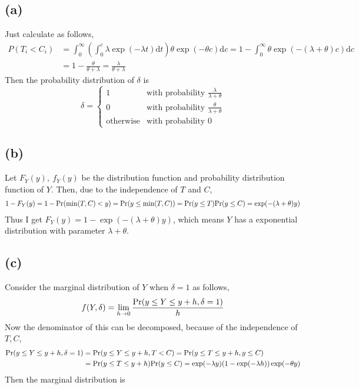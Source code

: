 \documentclass{article}
\begin{document}
\subsection{(a)}
Just calculate as follows,
\begin{align*}
	P(T_i < C_i) &= \int_0^{\infty} \left( \int_0^c \lambda \exp\left( -\lambda t \right) \mathrm{d}t\right) \theta \exp \left( -\theta c \right) \mathrm{d}c = 1 - \int_0^{\infty} \theta \exp \left( -(\lambda+\theta)c \right) \mathrm{d}c \\
	&= 1 - \frac{\theta}{\theta + \lambda} = \frac{\lambda}{ \theta + \lambda}
\end{align*}
Then the probability distribution of $\delta$ is
\begin{equation}
	\delta = 
	\begin{cases}
		1 & \text{with probability $\frac{\lambda}{\lambda + \theta}$} \\
		0 & \text{with probability $\frac{\theta}{\lambda + \theta}$} \\
		\text{otherwise} & \text{with probability $0$}
	\end{cases} \nonumber
\end{equation}

\subsection{(b)}
Let $F_Y(y),\ f_Y(y)$ be the distribution function and probability distribution function of $Y$. Then, due to the independence of $T$ and $C$,
\begin{align*}
	1 - F_Y(y) = 1- {\rm Pr} (\min(T, C) < y) = {\rm Pr}(y \leq \min(T,C)) = {\rm Pr}(y \leq T) {\rm Pr}(y \leq C) = \exp(-(\lambda + \theta)y)
\end{align*}
Thus I get $F_Y(y) = 1 - \exp(-(\lambda + \theta)y)$, which means $Y$ has a exponential distribution with parameter $\lambda + \theta$.

\subsection{(c)}
Consider the marginal distribution of $Y$ when $\delta = 1$ as follows,
\begin{align*}
	f(Y, \delta) = \lim_{h \to 0} \frac{{\rm Pr}(y \leq Y \leq y + h, \delta = 1)}{h}
\end{align*}
Now the denominator of this can be decomposed, because of the independence of $T, C$, 
\begin{align*}
	{\rm Pr}(y \leq Y \leq y + h, \delta = 1) &= {\rm Pr}(y \leq Y \leq y + h, T < C) = {\rm Pr}(y \leq T \leq y + h, y \leq C) \\
	&= {\rm Pr}(y \leq T \leq y + h) {\rm Pr}(y \leq C) = \exp(-\lambda y) (1 - \exp(-\lambda h)) \exp(-\theta y) \\
\end{align*}
Then the marginal distribution is 
\end{document}
